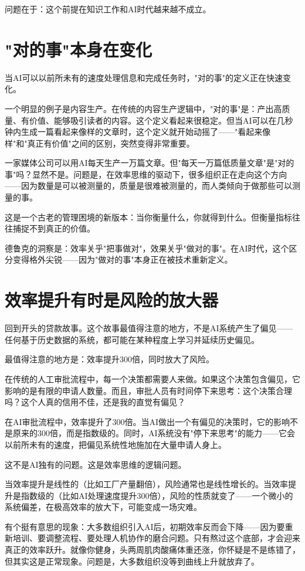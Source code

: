 问题在于：这个前提在知识工作和AI时代越来越不成立。


\section{"对的事"本身在变化}


当AI可以以前所未有的速度处理信息和完成任务时，"对的事"的定义正在快速变化。

一个明显的例子是内容生产。在传统的内容生产逻辑中，"对的事"是：产出高质量、有价值、能够吸引读者的内容。这个定义看起来很稳定。但当AI可以在几秒钟内生成一篇看起来像样的文章时，这个定义就开始动摇了——"看起来像样"和"真正有价值"之间的区别，突然变得非常重要。

一家媒体公司可以用AI每天生产一万篇文章。但"每天一万篇低质量文章"是"对的事"吗？显然不是。问题是，在效率思维的驱动下，很多组织正在走向这个方向——因为数量是可以被测量的，质量是很难被测量的，而人类倾向于做那些可以测量的事。

这是一个古老的管理困境的新版本：当你衡量什么，你就得到什么。但衡量指标往往捕捉不到真正的价值。

德鲁克的洞察是：效率关乎"把事做对"，效果关乎"做对的事"。在AI时代，这个区分变得格外尖锐——因为"做对的事"本身正在被技术重新定义。


\section{效率提升有时是风险的放大器}


回到开头的贷款故事。这个故事最值得注意的地方，不是AI系统产生了偏见——任何基于历史数据的系统，都可能在某种程度上学习并延续历史偏见。

最值得注意的地方是：效率提升300倍，同时放大了风险。

在传统的人工审批流程中，每一个决策都需要人来做。如果这个决策包含偏见，它影响的是有限的申请人数量。而且，审批人员有时间停下来思考：这个决策合理吗？这个人真的信用不佳，还是我的直觉有偏见？

在AI审批流程中，效率提升了300倍。当AI做出一个有偏见的决策时，它的影响不是原来的300倍，而是指数级的。同时，AI系统没有"停下来思考"的能力——它会以前所未有的速度，把偏见系统性地施加在大量申请人身上。

这不是AI独有的问题。这是效率思维的逻辑问题。

当效率提升是线性的（比如工厂产量翻倍），风险通常也是线性增长的。当效率提升是指数级的（比如AI处理速度提升300倍），风险的性质就变了——一个微小的系统偏差，在极高效率的放大下，可能变成一场灾难。

有个挺有意思的现象：大多数组织引入AI后，初期效率反而会下降——因为要重新培训、要调整流程、要处理人机协作的磨合问题。只有熬过这个底部，才会迎来真正的效率跃升。就像你健身，头两周肌肉酸痛体重还涨，你怀疑是不是练错了，但其实这是正常现象。问题是，大多数组织没等到曲线上升就放弃了。

